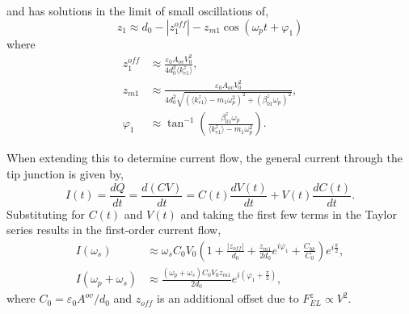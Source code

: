 \documentclass{article}
\begin{document}
and has solutions in the limit of small oscillations of,
\begin{equation}
z_1 \approx d_0 - \left|z_{1}^{off}\right| - z_{m1}\cos(\omega_pt+\varphi_1)
\label{eq:tip_oscillation_app}
\end{equation}
where
\begin{subequations}
\begin{align}
z_1^{off} &\approx %
\frac{ \varepsilon_0 A_{ov} V_0^2 }{ 4d_0^2 \langle k_{e1}^z \rangle }, \label{eq:tip_amp_app}\\
%
z_{m1} &\approx %
\frac{ \varepsilon_0 A_{ov} V_0^2 }%
{ 4d_0^2 \sqrt{ (\langle k_{e1}^z \rangle - m_1\omega_p^2)^2 + (\beta_{01}^z\omega_p)^2  } }, \\
%
\varphi_1 &\approx \tan^{-1}\left(\frac{\beta_{01}^{z}\omega_{p}}{\langle k_{e1}^{z} \rangle -m_{1}\omega_{p}^{2}}\right). \label{eq:tip_phase_app}
\end{align}
\end{subequations}

When extending this to determine current flow, the general current through the tip junction is given by,
\begin{equation}
I(t) = \frac{dQ}{dt} = \frac{d(CV)}{dt} = C(t)\frac{dV(t)}{dt} + V(t)\frac{dC(t)}{dt}.
\end{equation}
Substituting for $C(t)$ and $V(t)$ and taking the first few terms in the Taylor series results in the first-order current flow,
\begin{subequations}
\begin{align}
I(\omega_{s}) & \approx \omega_{s}C_{0}V_{0} \left(1+\frac{|z_{off}|}{d_{0}}+\frac{z_{m1}}{2d_{0}}e^{i\varphi_1}+\frac{C_{bk}}{C_{0}}\right)e^{i\frac{\pi}{2}},\\
%
I(\omega_{p}+\omega_{s}) & \approx \frac{\left(\omega_{p}+\omega_{s}\right)C_{0}V_{0}z_{m1}}{2d_{0}} e^{i\left(\varphi_1 + \frac{\pi}{2}\right)},
\label{eq:3rd_harmonic_current_app}
\end{align}
\end{subequations}
where $C_0 = \varepsilon_0 A^{ov} / d_0$ and $z_{off}$ is an additional offset due to $F_{EL}^z \propto V^2$.
\end{document}
